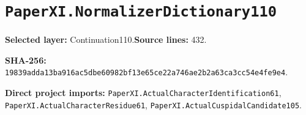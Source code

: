 \documentclass[10pt,oneside]{book}
\begin{document}
\section{\texorpdfstring{\nolinkurl{PaperXI.NormalizerDictionary110}}{PaperXI.NormalizerDictionary110}}\label{module:PaperXI.NormalizerDictionary110}

\textbf{Selected layer:} Continuation110.\quad\textbf{Source lines:} 432.\par\textbf{SHA-256:} {\scriptsize\nolinkurl{19839adda13ba916ac5dbe60982bf13e65ce22a746ae2b2a63ca3cc54e4fe9e4}}.


\textbf{Direct project imports:} \nolinkurl{PaperXI.ActualCharacterIdentification61}, \nolinkurl{PaperXI.ActualCharacterResidue61}, \nolinkurl{PaperXI.ActualCuspidalCandidate105}.
\end{document}
